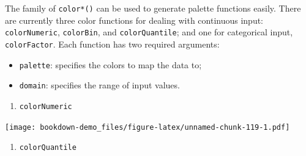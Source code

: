 \documentclass[]{book}
\newenvironment{Shaded}{\begin{snugshade}}{\end{snugshade}}
\newcommand{\KeywordTok}[1]{\textcolor[rgb]{0.13,0.29,0.53}{\textbf{#1}}}
\newcommand{\DataTypeTok}[1]{\textcolor[rgb]{0.13,0.29,0.53}{#1}}
\newcommand{\DecValTok}[1]{\textcolor[rgb]{0.00,0.00,0.81}{#1}}
\newcommand{\StringTok}[1]{\textcolor[rgb]{0.31,0.60,0.02}{#1}}
\newcommand{\OperatorTok}[1]{\textcolor[rgb]{0.81,0.36,0.00}{\textbf{#1}}}
\newcommand{\NormalTok}[1]{#1}
\providecommand{\tightlist}{%
  \setlength{\itemsep}{0pt}\setlength{\parskip}{0pt}}
\begin{document}
The family of \texttt{color*()} can be used to generate palette
functions easily. There are currently three color functions for dealing
with continuous input: \texttt{colorNumeric}, \texttt{colorBin}, and
\texttt{colorQuantile}; and one for categorical input,
\texttt{colorFactor}. Each function has two required arguments:

\begin{itemize}
\tightlist
\item
  \texttt{palette}: specifies the colors to map the data to;
\item
  \texttt{domain}: specifies the range of input values.
\end{itemize}

\begin{enumerate}
\def\labelenumi{\arabic{enumi}.}
\tightlist
\item
  \texttt{colorNumeric}
\end{enumerate}

\begin{Shaded}
\end{Shaded}

\texttt{[image: bookdown-demo\_files/figure-latex/unnamed-chunk-119-1.pdf]}

\begin{enumerate}
\def\labelenumi{\arabic{enumi}.}
\setcounter{enumi}{1}
\tightlist
\item
  \texttt{colorQuantile}
\end{enumerate}

\begin{Shaded}
\end{Shaded}
\end{document}
